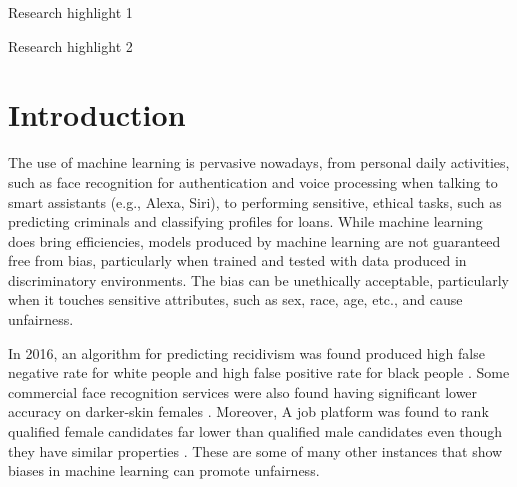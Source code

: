 \documentclass[final,5p,times,twocolumn]{elsarticle}
\begin{document}
\begin{frontmatter}
\begin{graphicalabstract}
\end{graphicalabstract}

\begin{highlights}
\item Research highlight 1
\item Research highlight 2
\end{highlights}

\begin{keyword}



\end{keyword}

\end{frontmatter}


\section{Introduction}
\label{sec:introduction}
The use of machine learning is pervasive nowadays, from personal daily activities, such as face recognition for authentication and voice processing when talking to smart assistants (e.g., Alexa, Siri), to performing sensitive, ethical tasks, such as predicting criminals and classifying profiles for loans. While machine learning does bring efficiencies, models produced by machine learning are not guaranteed free from bias, particularly when trained and tested with data produced in discriminatory environments. The bias can be unethically acceptable, particularly when it touches sensitive attributes, such as sex, race, age, etc., and cause unfairness. 

In 2016, an algorithm for predicting recidivism was found produced high false negative rate for white people and high false positive rate for black people \cite{angwin2016machine}. Some commercial face recognition services were also found having significant lower accuracy on darker-skin females \cite{buolamwini2018gender}. Moreover, A job platform was found to rank qualified female candidates far lower than qualified male candidates even though they have similar properties \cite{lahoti2019ifair}. These are some of many other instances that show biases in machine learning can promote unfairness. 
\end{document}
